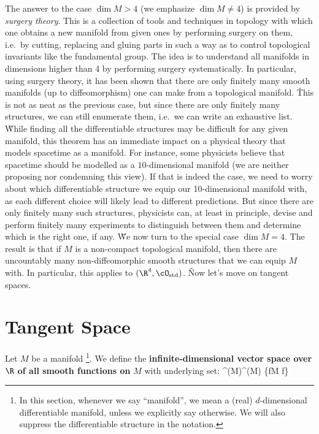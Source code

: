 The answer to the case $\dim M > 4$ (we emphasize $\dim M \neq 4$) is provided by \emph{surgery theory}. This is a
collection of tools and techniques in topology with which one obtains a new manifold from given ones by performing
surgery on them, i.e.\ by cutting, replacing and gluing parts in such a way as to control topological invariants like
the fundamental group. The idea is to understand all manifolds in dimensions higher than 4 by performing surgery
systematically. In particular, using surgery theory, it has been shown that there are only finitely many smooth
manifolds (up to diffeomorphism) one can make from a topological manifold. \v

This is not as neat as the previous case, but since there are only finitely many structures, we can still enumerate
them, i.e.\ we can write an exhaustive list. \v

While finding all the differentiable structures may be difficult for any given manifold, this theorem has an
immediate impact on a physical theory that models spacetime as a manifold. For instance, some physicists believe that
spacetime should be modelled as a $10$-dimensional manifold (we are neither proposing nor condemning this view). If
that is indeed the case, we need to worry about which differentiable structure we equip our 10-dimensional manifold
with, as each different choice will likely lead to different predictions. But since there are only finitely many such
structures, physicists can, at least in principle, devise and perform finitely many experiments to distinguish
between them and determine which is the right one, if any. \v

We now turn to the special case $\dim M = 4$. The result is that if $M$ is a non-compact topological manifold, then
there are uncountably many non-diffeomorphic smooth structures that we can equip $M$ with. In particular, this
applies to $(\R^4,\cO_\mathrm{std})$. \v

Now let's move on tangent spaces.

\section{Tangent Space}

Let $M$ be a manifold \footnote{In this section, whenever we say ``manifold'', we mean a (real) $d$-dimensional
differentiable manifold, unless we explicitly say otherwise. We will also suppress the differentiable structure in
the notation. }. We define the \textbf{infinite-dimensional vector space over} $\R$ \textbf{of all smooth functions
on} $M$ with underlying set:
\bse
{}^\infty(M)^\infty(M) \coloneqq \{f\cl M \to \R \mid f\}
\ese

